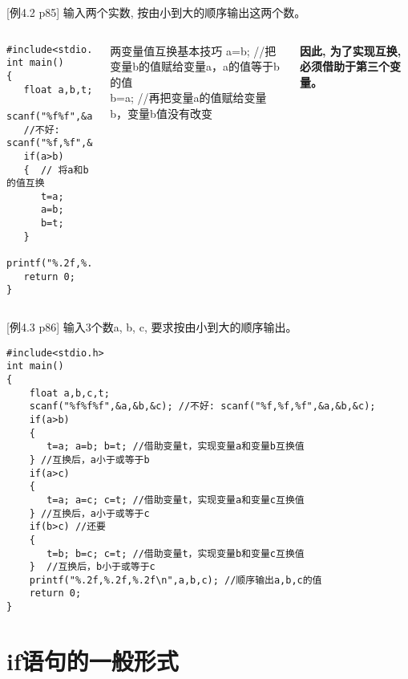 \begin{frame}
\small [例4.2 p85] 输入两个实数, 按由小到大的顺序输出这两个数。
\begin{columns}
\begin{lstlisting}
#include<stdio.h>        
int main()                   
{  
   float a,b,t;
   scanf("%f%f",&a,&b); 
   //不好: scanf("%f,%f",&a,&b);
   if(a>b)
   {  // 将a和b的值互换
      t=a;
      a=b;
      b=t;
   }
   printf("%.2f,%.2f\n",a,b);
   return 0;           
}
\end{lstlisting} 
\small
\begin{block}{两变量值互换基本技巧}
a=b;  //把变量b的值赋给变量a，a的值等于b的值\\
b=a;  //再把变量a的值赋给变量b，变量b值没有改变
\end{block}
\textbf{因此, 为了实现互换, 必须借助于第三个变量。}
\end{columns}                           
\end{frame}

\begin{frame}
\small [例4.3 p86] 输入3个数a, b, c, 要求按由小到大的顺序输出。
\begin{lstlisting}
#include<stdio.h>        
int main()                   
{  
    float a,b,c,t;
    scanf("%f%f%f",&a,&b,&c); //不好: scanf("%f,%f,%f",&a,&b,&c);
    if(a>b)
    {
       t=a; a=b; b=t; //借助变量t，实现变量a和变量b互换值
    } //互换后，a小于或等于b     
    if(a>c)
    {
       t=a; a=c; c=t; //借助变量t，实现变量a和变量c互换值
    } //互换后，a小于或等于c       
    if(b>c) //还要
    { 
       t=b; b=c; c=t; //借助变量t，实现变量b和变量c互换值
    }  //互换后，b小于或等于c                       
    printf("%.2f,%.2f,%.2f\n",a,b,c); //顺序输出a,b,c的值
    return 0;  
}
\end{lstlisting}                   
\end{frame}

\section{if语句的一般形式}

